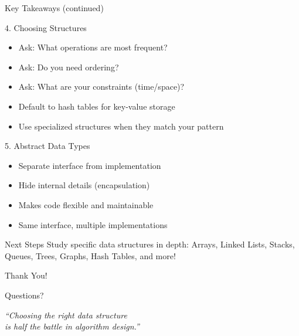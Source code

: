\documentclass[aspectratio=169,xcolor=dvipsnames]{beamer}
\begin{document}
\begin{frame}{Key Takeaways (continued)}
  \begin{block}{4. Choosing Structures}
    \begin{itemize}
      \item Ask: What operations are most frequent?
      \item Ask: Do you need ordering?
      \item Ask: What are your constraints (time/space)?
      \item Default to hash tables for key-value storage
      \item Use specialized structures when they match your pattern
    \end{itemize}
  \end{block}

  \begin{block}{5. Abstract Data Types}
    \begin{itemize}
      \item Separate interface from implementation
      \item Hide internal details (encapsulation)
      \item Makes code flexible and maintainable
      \item Same interface, multiple implementations
    \end{itemize}
  \end{block}

  \vspace{0.3cm}

  \begin{alertblock}{Next Steps}
    Study specific data structures in depth: Arrays, Linked Lists, Stacks, Queues, Trees, Graphs, Hash Tables, and more!
  \end{alertblock}
\end{frame}

\begin{frame}[plain]
  \begin{center}
    {\Huge Thank You!}

    \vspace{1cm}

    {\large Questions?}

    \vspace{1cm}

    \textit{``Choosing the right data structure \\
    is half the battle in algorithm design.''}
  \end{center}
\end{frame}
\end{document}
